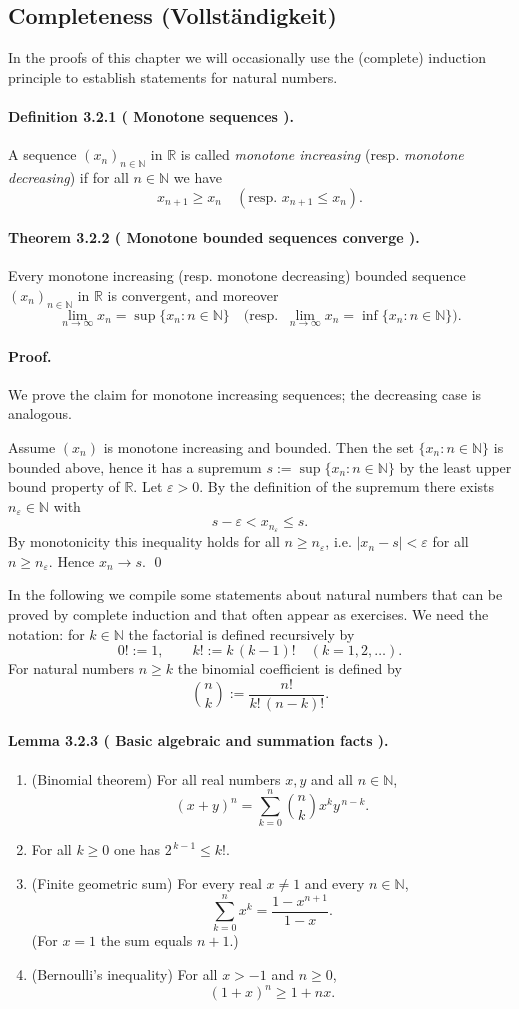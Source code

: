 \documentclass[12pt,a4paper]{article}
\newcommand{\N}{\mathbb{N}}
\newcommand{\R}{\mathbb{R}}
\newcommand{\eps}{\varepsilon}
\newcommand{\NumberedDefinition}[3]{%
\paragraph*{Definition #1 ( #2 ).} #3\par}
\newcommand{\NumberedTheorem}[3]{%
\paragraph*{Theorem #1 ( #2 ).} #3\par}
\newcommand{\NumberedLemma}[3]{%
\paragraph*{Lemma #1 ( #2 ).} #3\par}
\theoremstyle{plain}
\theoremstyle{definition}
\theoremstyle{remark}
\begin{document}
\subsection{Completeness (Vollständigkeit)}

In the proofs of this chapter we will occasionally use the (complete) induction principle to establish statements for natural numbers.

\NumberedDefinition{3.2.1}{Monotone sequences}{A sequence $(x_n)_{n\in\N}$ in $\R$ is called \emph{monotone increasing} (resp. \emph{monotone decreasing}) if for all $n\in\N$ we have
\[
	x_{n+1} \ge x_n \quad (\text{resp. } x_{n+1} \le x_n ).
\]}

\NumberedTheorem{3.2.2}{Monotone bounded sequences converge}{Every monotone increasing (resp. monotone decreasing) bounded sequence $(x_n)_{n\in\N}$ in $\R$ is convergent, and moreover
\[
	\lim_{n\to\infty} x_n = \sup\{x_n : n\in\N\} \quad\big(\text{resp. }\ \lim_{n\to\infty} x_n = \inf\{x_n : n\in\N\}\big).
\]}

\paragraph{Proof.} We prove the claim for monotone increasing sequences; the decreasing case is analogous.

Assume $(x_n)$ is monotone increasing and bounded. Then the set $\{x_n : n\in\N\}$ is bounded above, hence it has a supremum $s:=\sup\{x_n : n\in\N\}$ by the least upper bound property of $\R$. Let $\eps>0$. By the definition of the supremum there exists $n_\eps\in\N$ with
\[
	s-\eps < x_{n_\eps} \le s.
\]
By monotonicity this inequality holds for all $n\ge n_\eps$, i.e. $|x_n-s|<\eps$ for all $n\ge n_\eps$. Hence $x_n\to s$.
\qed

In the following we compile some statements about natural numbers that can be proved by complete induction and that often appear as exercises. We need the notation: for $k\in\N$ the factorial is defined recursively by
\[
	0! := 1, \qquad k! := k\,(k-1)! \quad (k=1,2,\dots).
\]
For natural numbers $n\ge k$ the binomial coefficient is defined by
\[
	\binom{n}{k} := \frac{n!}{k!\,(n-k)!}.
\]

\NumberedLemma{3.2.3}{Basic algebraic and summation facts}{
\begin{enumerate}[label={(\arabic*)}, leftmargin=*]
	\item (Binomial theorem) For all real numbers $x,y$ and all $n\in\N$,
	\[
		(x+y)^n = \sum_{k=0}^{n} \binom{n}{k} x^{k} y^{\,n-k}.
	\]

	\item For all $k\ge 0$ one has $2^{\,k-1} \le k!$.

	\item (Finite geometric sum) For every real $x\ne 1$ and every $n\in\N$,
	\[
		\sum_{k=0}^{n} x^k = \frac{1 - x^{n+1}}{1-x}.
	\]
	(For $x=1$ the sum equals $n+1$.)

	\item (Bernoulli's inequality) For all $x>-1$ and $n\ge 0$,
	\[
		(1+x)^n \ge 1 + n x.
	\]
\end{enumerate}}
\end{document}
